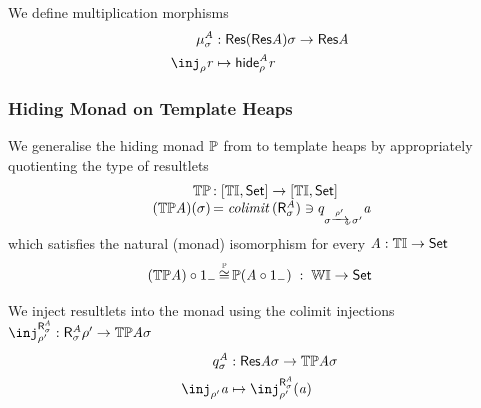 \begin{definition}
    We define multiplication morphisms
    \begin{align*}
        \mu^\vA_\sigma & : \typeRes(\typeRes\vA)\sigma \to \typeRes\vA \\
        \inj_\rho \vr & \mapsto \hideRes\vA\rho\vr
    \end{align*}
\end{definition}

\subsubsection{Hiding Monad on Template Heaps}
\label{sec:tinstC-hiding-monad}

\begin{definition}
We generalise the hiding monad ${\mathbb{P}}$ from \cite{kammar2017monad} to template heaps by appropriately quotienting the type of resultlets 
\[\begin{array}{r@{\spac}l@{\spac}l}
    \thideMon              & : \funC\tinstC\setC \to \funC\tinstC\setC \\
    (\thideMon\vA)(\sigma) & = \Colimit{(\resF\vA_\sigma)} \ni \eqclass{\sigma \xato{\rho'} \sigma'} \va
\end{array}\]
which satisfies the natural (monad) isomorphism for every $\mathit{A} : {\mathbb{T}\mathbb{I}} \to \mathsf{Set}$
\[ ({\mathbb{T}{\mathbb{P}}}\mathit{A}) \circ 1_{-} \,{\overset{\mbox{\tiny ${\mathbb{P}}$}}{\cong}}\, {\mathbb{P}}(\mathit{A} \circ 1_{-}) \;:\; \mathbb{W}\mathbb{I} \to \mathsf{Set} \]

We inject resultlets into the monad using the colimit injections $\inj^{\resF\vA_\sigma}_{\rho'} : \resF\vA_\sigma\rho' \to \thideMon\vA\sigma$
\begin{align*}
    \quot^\vA_\sigma & : \typeRes\vA\sigma \to \thideMon\vA\sigma \\
    \inj_{\rho'}\va & \mapsto \inj^{\resF\vA_\sigma}_{\rho'}(\va)
\end{align*}
\end{definition}

